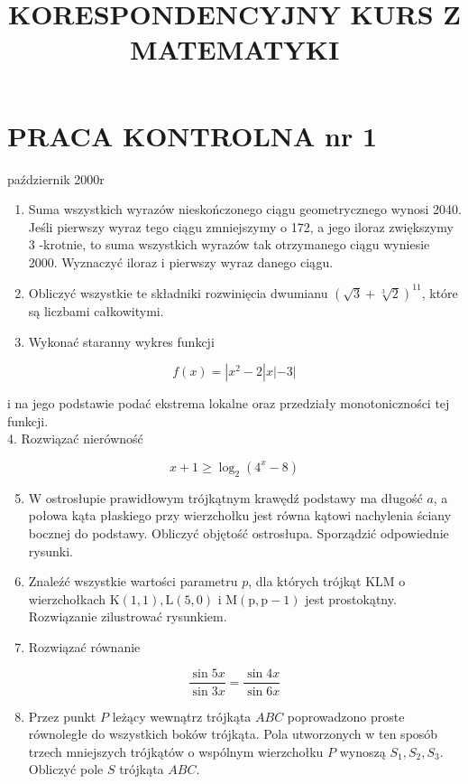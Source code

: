 \documentclass[10pt]{article}
\title{KORESPONDENCYJNY KURS Z MATEMATYKI }
\author{}
\date{}
\begin{document}
\maketitle
\section*{PRACA KONTROLNA nr 1}
październik 2000r

\begin{enumerate}
  \item Suma wszystkich wyrazów nieskończonego ciągu geometrycznego wynosi 2040. Jeśli pierwszy wyraz tego ciągu zmniejszymy o 172, a jego iloraz zwiększymy 3 -krotnie, to suma wszystkich wyrazów tak otrzymanego ciągu wyniesie 2000. Wyznaczyć iloraz i pierwszy wyraz danego ciągu.
  \item Obliczyć wszystkie te składniki rozwinięcia dwumianu $(\sqrt{3}+\sqrt[3]{2})^{11}$, które są liczbami całkowitymi.
  \item Wykonać staranny wykres funkcji
\end{enumerate}

$$
f(x)=\left|x^{2}-2\right| x|-3|
$$

i na jego podstawie podać ekstrema lokalne oraz przedziały monotoniczności tej funkcji.\\
4. Rozwiązać nierówność

$$
x+1 \geqslant \log _{2}\left(4^{x}-8\right)
$$

\begin{enumerate}
  \setcounter{enumi}{4}
  \item W ostrosłupie prawidłowym trójkątnym krawędź podstawy ma długość $a$, a połowa kąta płaskiego przy wierzchołku jest równa kątowi nachylenia ściany bocznej do podstawy. Obliczyć objętość ostrosłupa. Sporządzić odpowiednie rysunki.
  \item Znaleźć wszystkie wartości parametru $p$, dla których trójkąt KLM o wierzchołkach $\mathrm{K}(1,1), \mathrm{L}(5,0)$ i $\mathrm{M}(\mathrm{p}, \mathrm{p}-1)$ jest prostokątny. Rozwiązanie zilustrować rysunkiem.
  \item Rozwiązać równanie
\end{enumerate}

$$
\frac{\sin 5 x}{\sin 3 x}=\frac{\sin 4 x}{\sin 6 x}
$$

\begin{enumerate}
  \setcounter{enumi}{7}
  \item Przez punkt $P$ leżący wewnątrz trójkąta $A B C$ poprowadzono proste równoległe do wszystkich boków trójkąta. Pola utworzonych w ten sposób trzech mniejszych trójkątów o wspólnym wierzchołku $P$ wynoszą $S_{1}, S_{2}, S_{3}$. Obliczyć pole $S$ trójkąta $A B C$.
\end{enumerate}
\end{document}
